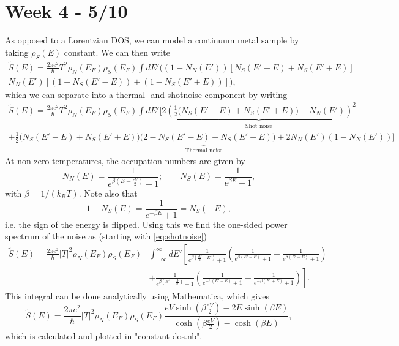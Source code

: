 \section{Week 4 - 5/10}
As opposed to a Lorentzian DOS, we can model a continuum metal sample by taking $\rho_S(E)$ constant. We can then write
\begin{align}
    \tilde{S}(E) = \frac{2\pi e^2}{\hbar}T^2\rho_N(E_F)\rho_S(E_F)\int dE'\biggl((1-N_N(E'))\left[N_S(E'-E) + N_S(E'+E)\right] \\
    N_N(E')\left[(1-N_S(E'-E)) + (1-N_S(E'+E))\right]\biggr),
\end{align} 
which we can separate into a thermal- and shotnoise component by writing 
\begin{align}
    \tilde{S}(E) = \frac{2\pi e^2}{\hbar}T^2\rho_N(E_F)\rho_S(E_F)\int dE'\biggl[\underbrace{2\left(\frac{1}{2}\bigl(N_S(E'-E)+N_S(E'+E)\bigr)-N_N(E')\right)^2}_\textrm{Shot noise}\nonumber\\+ \underbrace{\frac{1}{2}\bigl(N_S(E'-E) + N_S(E'+E)\bigr)\bigl(2-N_S(E'-E)-N_S(E'+E)\bigr)
    +2N_N(E')(1-N_N(E'))}_\textrm{Thermal noise} \biggr]
\end{align}
At non-zero temperatures, the occupation numbers are given by
\begin{equation}
    N_N(E) = \frac{1}{e^{\beta (E-\frac{eV}{2})} + 1}; \qquad N_S(E) = \frac{1}{e^{\beta E}+1},
\end{equation}
with $\beta = 1/(k_BT)$. Note also that 
\begin{equation}
    1-N_S(E) = \frac{1}{e^{-\beta E}+1} = N_S(-E),
\end{equation}
i.e. the sign of the energy is flipped. Using this we find the one-sided power spectrum  of the noise as (starting with \autoref{eq:shotnoise})
\begin{align}
    \tilde{S}(E) = \frac{2\pi e^2}{\hbar}|T|^2\rho_N(E_F)\rho_S(E_F) &\int_{-\infty}^\infty dE'\left[\frac{1}{e^{\beta (\frac{eV}{2} - E')}+1}\left(\frac{1}{e^{\beta (E'-E)}+1}+\frac{1}{e^{\beta (E'+E)}+1}\right)\right. \nonumber\\
    &\left.+\frac{1}{e^{\beta (E'-\frac{eV}{2})}+1}\left(\frac{1}{e^{-\beta (E'-E)}+1}+\frac{1}{e^{-\beta (E'+E)}+1}\right) \right].
\end{align}
This integral can be done analytically using Mathematica, which gives
\begin{equation}
    \tilde{S}(E) = \frac{2\pi e^2}{\hbar}|T|^2\rho_N(E_F)\rho_S(E_F)\frac{eV \sinh\left(\beta \frac{eV}{2}\right) - 2 E\sinh\left(\beta E\right)}{\cosh\left(\beta\frac{eV}{2}\right)-\cosh\left(\beta E \right)},
\end{equation}
which is calculated and plotted in "constant-dos.nb".


